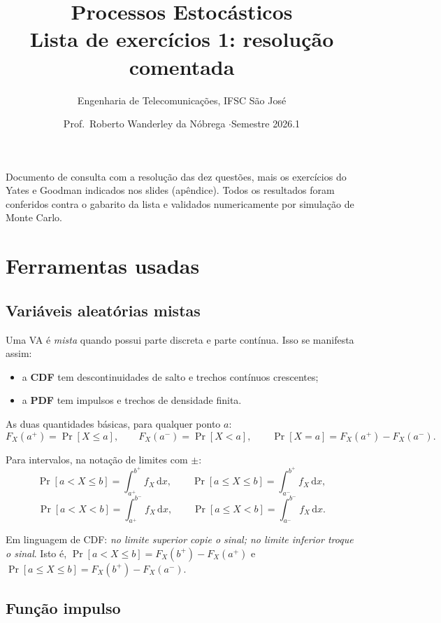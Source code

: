 \documentclass[11pt,a4paper]{article}
\title{\vspace{-1.2cm}\textbf{Processos Estocásticos}\\[2pt]
\large Lista de exercícios 1: resolução comentada}
\author{Engenharia de Telecomunicações, IFSC São José}
\date{Prof.\ Roberto Wanderley da Nóbrega \quad$\cdot$\quad Semestre 2026.1}
\newcommand{\dd}{\,\mathrm{d}}
\renewcommand{\Pr}{\operatorname{Pr}}
\begin{document}
\maketitle
\thispagestyle{fancy}

\begin{resp}
\small Documento de consulta com a resolução das dez questões, mais os exercícios
do Yates e Goodman indicados nos slides (apêndice). Todos os resultados foram
conferidos contra o gabarito da lista e validados numericamente por simulação de
Monte Carlo.
\end{resp}

\tableofcontents

\section{Ferramentas usadas}

\subsection*{Variáveis aleatórias mistas}

Uma VA é \emph{mista} quando possui parte discreta e parte contínua. Isso se
manifesta assim:
\begin{itemize}[nosep,leftmargin=*]
\item a \textbf{CDF} tem descontinuidades de salto e trechos contínuos crescentes;
\item a \textbf{PDF} tem impulsos e trechos de densidade finita.
\end{itemize}

As duas quantidades básicas, para qualquer ponto $a$:
\[
F_X(a^+) = \Pr[X \le a], \qquad F_X(a^-) = \Pr[X < a],
\qquad \Pr[X=a] = F_X(a^+) - F_X(a^-).
\]

Para intervalos, na notação de limites com $\pm$:
\[
\Pr[a < X \le b] = \int_{a^+}^{b^+} f_X \dd x, \qquad
\Pr[a \le X \le b] = \int_{a^-}^{b^+} f_X \dd x,
\]
\[
\Pr[a < X < b] = \int_{a^+}^{b^-} f_X \dd x, \qquad
\Pr[a \le X < b] = \int_{a^-}^{b^-} f_X \dd x .
\]

Em linguagem de CDF: \emph{no limite superior copie o sinal; no limite inferior
troque o sinal}. Isto é, $\Pr[a<X\le b]=F_X(b^+)-F_X(a^+)$ e
$\Pr[a\le X\le b]=F_X(b^+)-F_X(a^-)$.

\subsection*{Função impulso}
\end{document}
